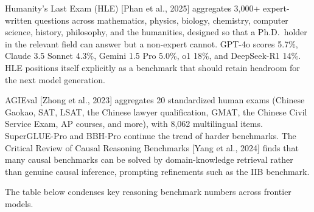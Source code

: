 Humanity's Last Exam (HLE) {[}Phan et al., 2025{]} aggregates 3,000+ expert-written questions across mathematics, physics, biology, chemistry, computer science, history, philosophy, and the humanities, designed so that a Ph.D.~holder in the relevant field can answer but a non-expert cannot. GPT-4o scores 5.7\%, Claude 3.5 Sonnet 4.3\%, Gemini 1.5 Pro 5.0\%, o1 18\%, and DeepSeek-R1 14\%. HLE positions itself explicitly as a benchmark that should retain headroom for the next model generation.

AGIEval {[}Zhong et al., 2023{]} aggregates 20 standardized human exams (Chinese Gaokao, SAT, LSAT, the Chinese lawyer qualification, GMAT, the Chinese Civil Service Exam, AP courses, and more), with 8,062 multilingual items. SuperGLUE-Pro and BBH-Pro continue the trend of harder benchmarks. The Critical Review of Causal Reasoning Benchmarks {[}Yang et al., 2024{]} finds that many causal benchmarks can be solved by domain-knowledge retrieval rather than genuine causal inference, prompting refinements such as the IIB benchmark.

The table below condenses key reasoning benchmark numbers across frontier models.

